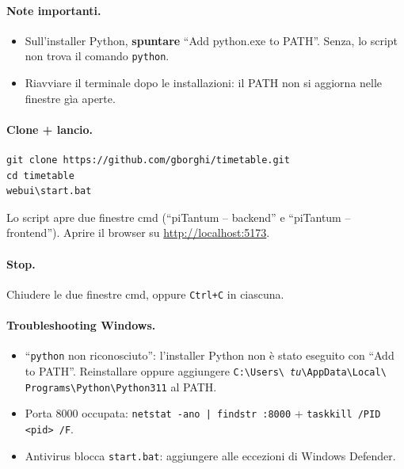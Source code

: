 \paragraph{Note importanti.}
\begin{itemize}
  \item Sull'installer Python, \textbf{spuntare} ``Add python.exe to
        PATH''. Senza, lo script non trova il comando \texttt{python}.
  \item Riavviare il terminale dopo le installazioni: il PATH non
        si aggiorna nelle finestre g\`ia aperte.
\end{itemize}

\paragraph{Clone + lancio.}
\begin{lstlisting}[style=shell]
git clone https://github.com/gborghi/timetable.git
cd timetable
webui\start.bat
\end{lstlisting}
Lo script apre due finestre cmd (``piTantum -- backend'' e
``piTantum -- frontend''). Aprire il browser su
\url{http://localhost:5173}.

\paragraph{Stop.} Chiudere le due finestre cmd, oppure
\texttt{Ctrl+C} in ciascuna.

\paragraph{Troubleshooting Windows.}
\begin{itemize}
  \item ``\texttt{python} non riconosciuto'': l'installer Python non
        \`e stato eseguito con ``Add to PATH''. Reinstallare oppure
        aggiungere \texttt{C:\textbackslash Users\textbackslash
        \emph{tu}\textbackslash AppData\textbackslash Local\textbackslash
        Programs\textbackslash Python\textbackslash Python311} al PATH.
  \item Porta 8000 occupata: \texttt{netstat -ano | findstr :8000}
        + \texttt{taskkill /PID <pid> /F}.
  \item Antivirus blocca \texttt{start.bat}: aggiungere alle
        eccezioni di Windows Defender.
\end{itemize}

